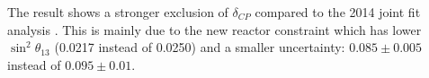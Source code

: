The result shows a stronger exclusion of $\delta_{CP}$ compared to the 2014 joint fit analysis \cite{OurRun1234JointOscillationAnalysis}.
This is mainly due to the new reactor constraint which has lower $\sin^2 \theta_{13}$ (0.0217 instead of 0.0250)
and a smaller uncertainty:
$0.085 \pm 0.005$ instead of
$0.095 \pm 0.01$.



\clearpage



%
%
%
%






\clearpage






